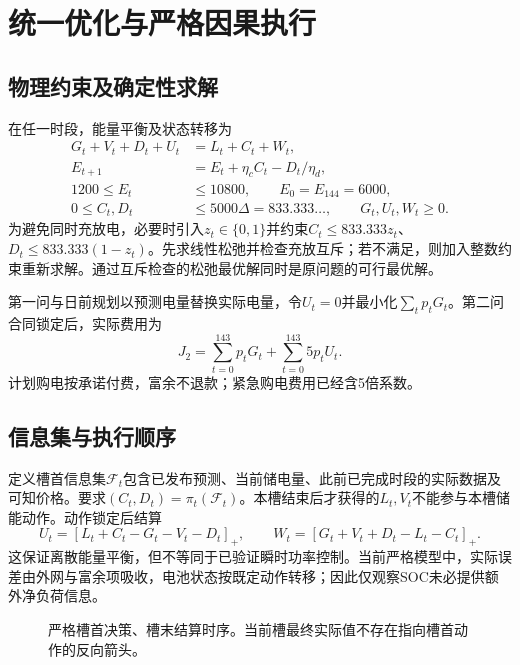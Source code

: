 \documentclass[UTF8,a4paper,zihao=-4,fontset=fandol]{ctexart}
\begin{document}
\FloatBarrier
\section{统一优化与严格因果执行}
\subsection{物理约束及确定性求解}
在任一时段，能量平衡及状态转移为
\begin{align}
G_t+V_t+D_t+U_t &= L_t+C_t+W_t,\\
E_{t+1}&=E_t+\eta_c C_t-D_t/\eta_d,\\
1200\le E_t&\le10800,\qquad E_0=E_{144}=6000,\\
0\le C_t,D_t&\le5000\Delta=833.333\ldots,\qquad G_t,U_t,W_t\ge0.
\end{align}
为避免同时充放电，必要时引入$z_t\in\{0,1\}$并约束$C_t\le833.333z_t$、$D_t\le833.333(1-z_t)$。先求线性松弛\cite{boyd}并检查充放互斥；若不满足，则加入整数约束重新求解。通过互斥检查的松弛最优解同时是原问题的可行最优解。

第一问与日前规划以预测电量替换实际电量，令$U_t=0$并最小化$\sum_t p_tG_t$。第二问合同锁定后，实际费用为
\begin{equation}\label{eq:cost}
J_2=\sum_{t=0}^{143}p_tG_t+\sum_{t=0}^{143}5p_tU_t.
\end{equation}
计划购电按承诺付费，富余不退款；紧急购电费用已经含5倍系数。

\subsection{信息集与执行顺序}
定义槽首信息集$\mathcal F_t$包含已发布预测、当前储电量、此前已完成时段的实际数据及可知价格。要求$(C_t,D_t)=\pi_t(\mathcal F_t)$。本槽结束后才获得的$L_t,V_t$不能参与本槽储能动作。动作锁定后结算
\begin{equation}
U_t=[L_t+C_t-G_t-V_t-D_t]_+,\qquad
W_t=[G_t+V_t+D_t-L_t-C_t]_+.
\end{equation}
这保证离散能量平衡，但不等同于已验证瞬时功率控制。当前严格模型中，实际误差由外网与富余项吸收，电池状态按既定动作转移；因此仅观察SOC未必提供额外净负荷信息。
\begin{figure}[H]\centering
{}
\caption{严格槽首决策、槽末结算时序。当前槽最终实际值不存在指向槽首动作的反向箭头。}
\end{figure}
\end{document}
